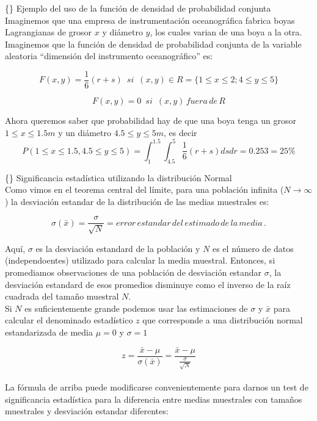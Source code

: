 \documentclass[
]{agujournal2019}
\begin{document}
\{\noindent\} Ejemplo del uso de la función de densidad de probabilidad
conjunta\\

Imaginemos que una empresa de instrumentación oceanográfica fabrica
boyas Lagrangianas de grosor \(x\) y diámetro \(y\), los cuales varian
de una boya a la otra. Imaginemos que la función de densidad de
probabilidad conjunta de la variable aleatoria ``dimensión del
instrumento oceanográfico'' es:

\[F(x,y)=\frac{1}{6}(r+s)\,\,\,si\,\,\,(x,y)\in R=\{1\le x \le 2 ; 4 \le y \le 5\}\]

\[F(x,y)=0\,\,\,si\,\,\,(x,y)\,fuera\,de\,R\]

Ahora queremos saber que probabilidad hay de que una boya tenga un
grosor \(1 \le x \le 1.5m\) y un diámetro \(4.5 \le y \le 5m\), es decir
\[P(1 \le x \le 1.5, 4.5 \le y \le 5)=\int^{1.5}_{1} \int^{5}_{4.5} \frac{1}{6}(r+s) ds dr = 0.253= 25\%\]

\vspace{0.5cm}

\{\noindent\} Significancia estadística utilizando la distribución
Normal\\

Como vimos en el teorema central del límite, para una población infinita
(\(N\rightarrow\infty\)) la desviación estandar de la distribución de
las medias muestrales es:

\[\sigma(\bar{x})=\frac{\sigma}{\sqrt{N}}=error\,estandar\,del\,estimado\,de\,la\,media\,.\]

Aquí, \(\sigma\) es la desviación estandard de la población y \(N\) es
el número de datos (independoentes) utilizado para calcular la media
muestral. Entonces, si promediamos observaciones de una población de
desviación estandar \(\sigma\), la desviación estandard de esos
promedios disminuye como el inverso de la raíz cuadrada del tamaño
muestral \(N\).\\

Si \(N\) es suficientemente grande podemos usar las estimaciones de
\(\sigma\) y \(\bar{x}\) para calcular el denominado estadístico \(z\)
que corresponde a una distribución normal estandarizada de media
\(\mu=0\) y \(\sigma=1\)

\[z=\frac{\bar{x}-\mu}{\sigma(\bar{x})}=\frac{\bar{x}-\mu}{\frac{\sigma}{\sqrt{N}}}\]\\

La fórmula de arriba puede modificarse convenientemente para darnos un
test de significancia estadística para la diferencia entre medias
muestrales con tamaños muestrales y desviación estandar diferentes:
\end{document}
